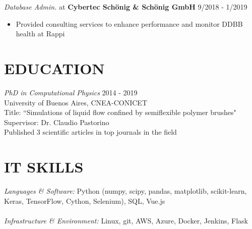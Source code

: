 \documentclass[margin]{res}
\begin{document}
\begin{resume}
    {\sl Database Admin.} at {\bf Cybertec Sch\"onig \& Sch\"onig GmbH} \hfill 9/2018 - 1/2019
	\begin{itemize}  \itemsep -2pt %
		 \item Provided consulting services to enhance performance and 
             monitor DDBB health at Rappi
    \end{itemize}


\section{EDUCATION} {\sl PhD in Computational Physics}  \hfill 2014 - 2019 \\
                University of Buenos Aires, CNEA-CONICET \\ 
                Title: ``Simulations of liquid flow confined by semiflexible 
		polymer brushes"  \\
                Supervisor: Dr. Claudio Pastorino \\ 
                Published 3 scientific articles in top journals in the field \\ 

 
    \section{IT SKILLS} {\sl Languages \& Software:} Python (numpy, scipy, pandas, matplotlib, scikit-learn, Keras, TensorFlow, Cython, Selenium), SQL, Vue.js \\ \\ 
    {\sl Infrastructure \& Environment:} Linux, git, AWS, Azure, Docker, Jenkins, Flask \\
               

\end{resume}
\end{document}
